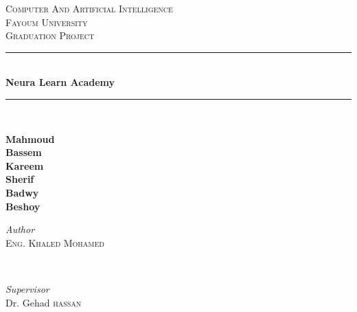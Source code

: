 \begin{titlepage} %
	\newcommand{\HRule}{\rule{\linewidth}{0.5mm}} %
	
	\center %
	
	
	\textsc{\LARGE  Computer And Artificial Intelligence}\\[1.5cm] %
	
	\textsc{\Large Fayoum University}\\[0.5cm] %
	
	\textsc{\large Graduation Project}\\[0.5cm] %
	
	\vspace{5mm}
	\HRule\\[0.4cm]
	
	{\huge\bfseries Neura Learn Academy}\\[0.4cm] %
	
	\HRule\\[1.5cm]
	
	\begin{spacing}{1}
		\begin{center}
			\textbf{\large Mahmoud  \\ Bassem \\ Kareem \\ 
			Sherif \\ Badwy \\ Beshoy}
			\vspace{50mm}
		\end{center}
	\end{spacing}
		
	\begin{minipage}{0.4\textwidth}
		\begin{flushleft}
			\large
			\textit{Author}\\
			\textsc{Eng. Khaled Mohamed} %
		\end{flushleft}
	\end{minipage}
	~
	\begin{minipage}{0.4\textwidth}
		\begin{flushright}
			\large
			\textit{Supervisor}\\
			Dr. Gehad \textsc{hassan} %
		\end{flushright}
	\end{minipage}
	

\end{titlepage}
